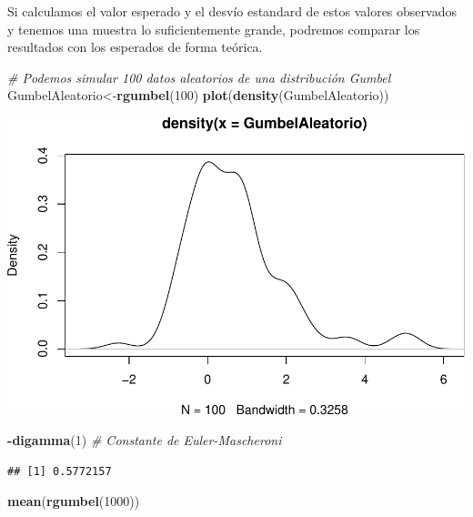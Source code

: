 \documentclass[
  oneside]{article}
\newenvironment{Shaded}{\begin{snugshade}}{\end{snugshade}}
\newcommand{\CommentTok}[1]{\textcolor[rgb]{0.56,0.35,0.01}{\textit{#1}}}
\newcommand{\DecValTok}[1]{\textcolor[rgb]{0.00,0.00,0.81}{#1}}
\newcommand{\FunctionTok}[1]{\textcolor[rgb]{0.13,0.29,0.53}{\textbf{#1}}}
\newcommand{\NormalTok}[1]{#1}
\newcommand{\OtherTok}[1]{\textcolor[rgb]{0.56,0.35,0.01}{#1}}
\newcommand{\SpecialCharTok}[1]{\textcolor[rgb]{0.81,0.36,0.00}{\textbf{#1}}}
\begin{document}
Si calculamos el valor esperado y el desvío estandard de estos valores
observados y tenemos una muestra lo suficientemente grande, podremos
comparar los resultados con los esperados de forma teórica.

\begin{Shaded}
\begin{Highlighting}[]
\CommentTok{\# Podemos simular 100 datos aleatorios de una distribución Gumbel}
\NormalTok{GumbelAleatorio}\OtherTok{\textless{}{-}}\FunctionTok{rgumbel}\NormalTok{(}\DecValTok{100}\NormalTok{)}
\FunctionTok{plot}\NormalTok{(}\FunctionTok{density}\NormalTok{(GumbelAleatorio))}
\end{Highlighting}
\end{Shaded}

\includegraphics{main_files/figure-latex/unnamed-chunk-33-1.pdf}

\begin{Shaded}
\begin{Highlighting}[]
\SpecialCharTok{{-}}\FunctionTok{digamma}\NormalTok{(}\DecValTok{1}\NormalTok{) }\CommentTok{\# Constante de Euler{-}Mascheroni}
\end{Highlighting}
\end{Shaded}

\begin{verbatim}
## [1] 0.5772157
\end{verbatim}

\begin{Shaded}
\begin{Highlighting}[]
\FunctionTok{mean}\NormalTok{(}\FunctionTok{rgumbel}\NormalTok{(}\DecValTok{1000}\NormalTok{))}
\end{Highlighting}
\end{Shaded}
\end{document}
